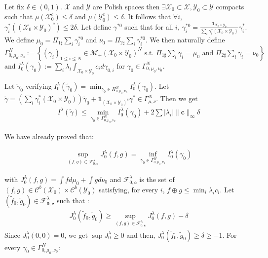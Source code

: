 \begin{prv*}
Let fix $\delta\in (0,1)$. $\mathcal{X}$ and $\mathcal{Y}$ are Polish spaces then $\exists  \mathcal{X}_0\subset \mathcal{X},  \mathcal{Y}_0\subset \mathcal{Y}$ compacts such that $\mu(\mathcal{X}_0^c) \leq  \delta$ and $\mu(\mathcal{Y}_0^c) \leq  \delta$.  It follows that $\forall i$, $\gamma^*_i((\mathcal{X}_0\times\mathcal{Y}_0)^c)\leq 2\delta$. Let define $\gamma^{*0}$ such that for all $i$, $\gamma^{*0}_{i}=\frac{\mathbf{1}_{\mathcal{X}_0\times\mathcal{Y}_0}}{\sum_i\gamma_i
^*(\mathcal{X}_0\times\mathcal{Y}_0)}\gamma^*_i$. We define $\mu_0 = \Pi_{1\sharp}\sum_i\gamma_{i}^{*0}$ and  $\nu_0 = \Pi_{2\sharp}\sum_i\gamma_{i}^{*0}$. We then naturally define $\Gamma^{N}_{0,\mu_0,\nu_0} :=\left\{(\gamma_i)_{1\leq i\leq N}\in \mathcal{M}_+(\mathcal{X}_0\times \mathcal{Y}_0)^N\text{ s.t. } \Pi_{1\sharp}\sum_i\gamma_i=\mu_0 \text{ and } \Pi_{2\sharp}\sum_i\gamma_i=\nu_0\right\}$ and $I^\lambda_0(\gamma_0) := \sum_i\lambda_i\int_{\mathcal{X}_0\times\mathcal{Y}_0}c_id\gamma_{0,i}$ for $\gamma_0\in\Gamma^{N}_{0,\mu_0,\nu_0}$. 

Let $\tilde{\gamma}_0$ verifying  $I^\lambda_0(\tilde{\gamma}_0) = \min_{\gamma_0\in\Pi^N_{0,\mu_0,\nu_0}}I^\lambda_0(\gamma_0)$. Let $\tilde{\gamma} = \left(\sum_i\gamma_i^*(\mathcal{X}_0\times\mathcal{Y}_0)\right)\tilde{\gamma}_0+\mathbf{1}_{(\mathcal{X}_0\times\mathcal{Y}_0)^c}\gamma^*\in \Gamma^N_{\mu,\nu}$. Then we get 
\begin{align*}
I^\lambda(\tilde{\gamma})\leq \min_{\gamma_0\in\Gamma^N_{0,\mu_0,\nu_0}}I^\lambda_0(\gamma_0)+2\sum|\lambda_i|\lVert \mathbf{c}\rVert_\infty\delta
\end{align*}

We have already proved that:

\begin{align*}
\sup\limits_{(f,g)\in\mathcal{F}^\lambda_{0,\mathbf{c}}}J_0^\lambda(f,g) = \inf\limits_{\gamma_0\in\Gamma^N_{0,\mu_0,\nu_0}}I_0^\lambda(\gamma_0)
\end{align*}

with $J_0^\lambda(f,g) = \int fd\mu_0+\int gd\nu_0$ and $\mathcal{F}^\lambda_{0,\mathbf{c}}$ is the set of $(f,g)\in\mathcal{C}^b(\mathcal{X}_0)\times \mathcal{C}^b(\mathcal{Y}_0)$ satisfying, for every $i$, $f\oplus g\leq\min_i\lambda_i c_i$. Let $(\tilde{f}_0,\tilde{g}_0)\in \mathcal{F}^\lambda_\mathbf{0,c}$ such that :
\begin{align*}
    J_0^\lambda(\tilde{f}_0,\tilde{g}_0)\geq \sup\limits_{(f,g)\in\mathcal{F}^\lambda_{0,\mathbf{c}}}J_0^\lambda(f,g)-\delta
\end{align*}
Since $J_0^\lambda(0,0)=0$, we get $\sup J_0^\lambda\geq 0$ and then,  $J_0^\lambda(\tilde{f}_0,\tilde{g}_0)\geq \delta\geq-1$. For every $\gamma_0 \in \Gamma^N_{0,\mu_0,\nu_0}$:


\end{prv*}
